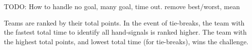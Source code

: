 TODO: How to handle no goal, many goal, time out. remove best/worst, mean

Teams are ranked by their total points. In the event of tie-breaks, the team with the fastest total time to identify all hand-signals is ranked higher. The team with the highest total points, and lowest total time (for tie-breaks), wins the challenge.